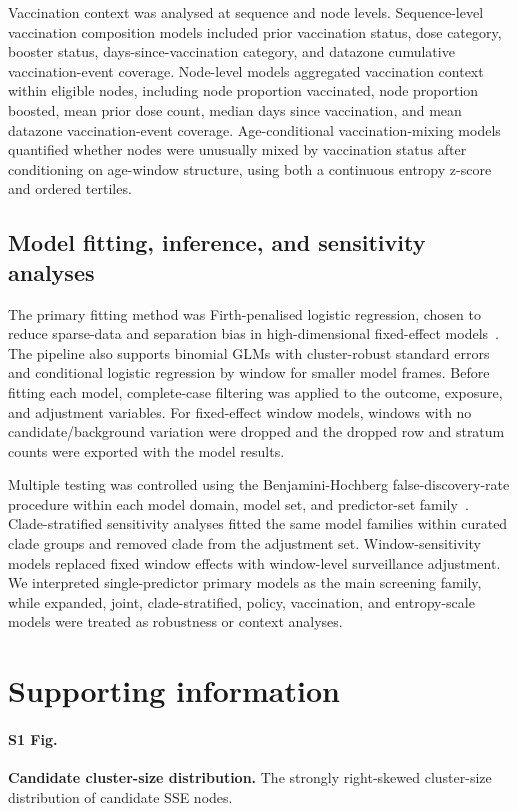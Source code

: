 \documentclass[10pt,letterpaper]{article}
\begin{document}
Vaccination context was analysed at sequence and node levels. Sequence-level vaccination composition models included prior vaccination status, dose category, booster status, days-since-vaccination category, and datazone cumulative vaccination-event coverage. Node-level models aggregated vaccination context within eligible nodes, including node proportion vaccinated, node proportion boosted, mean prior dose count, median days since vaccination, and mean datazone vaccination-event coverage. Age-conditional vaccination-mixing models quantified whether nodes were unusually mixed by vaccination status after conditioning on age-window structure, using both a continuous entropy z-score and ordered tertiles.

\subsection*{Model fitting, inference, and sensitivity analyses}

The primary fitting method was Firth-penalised logistic regression, chosen to reduce sparse-data and separation bias in high-dimensional fixed-effect models~\cite{Firth1993,Heinze2002}. The pipeline also supports binomial GLMs with cluster-robust standard errors and conditional logistic regression by window for smaller model frames. Before fitting each model, complete-case filtering was applied to the outcome, exposure, and adjustment variables. For fixed-effect window models, windows with no candidate/background variation were dropped and the dropped row and stratum counts were exported with the model results.

Multiple testing was controlled using the Benjamini-Hochberg false-discovery-rate procedure within each model domain, model set, and predictor-set family~\cite{Benjamini1995}. Clade-stratified sensitivity analyses fitted the same model families within curated clade groups and removed clade from the adjustment set. Window-sensitivity models replaced fixed window effects with window-level surveillance adjustment. We interpreted single-predictor primary models as the main screening family, while expanded, joint, clade-stratified, policy, vaccination, and entropy-scale models were treated as robustness or context analyses.

\section*{Supporting information}

\paragraph*{S1 Fig.}
{\bf Candidate cluster-size distribution.} The strongly right-skewed cluster-size distribution of candidate SSE nodes.
\end{document}
